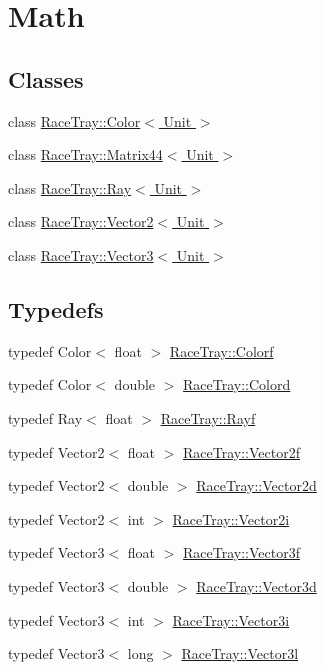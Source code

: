 \hypertarget{group___math}{\section{Math}
\label{group___math}
}
\subsection*{Classes}
\begin{DoxyCompactItemize}
\item 
class \hyperlink{class_race_tray_1_1_color}{Race\-Tray\-::\-Color$<$ Unit $>$}
\item 
class \hyperlink{class_race_tray_1_1_matrix44}{Race\-Tray\-::\-Matrix44$<$ Unit $>$}
\item 
class \hyperlink{class_race_tray_1_1_ray}{Race\-Tray\-::\-Ray$<$ Unit $>$}
\item 
class \hyperlink{class_race_tray_1_1_vector2}{Race\-Tray\-::\-Vector2$<$ Unit $>$}
\item 
class \hyperlink{class_race_tray_1_1_vector3}{Race\-Tray\-::\-Vector3$<$ Unit $>$}
\end{DoxyCompactItemize}
\subsection*{Typedefs}
\begin{DoxyCompactItemize}
\item 
typedef Color$<$ float $>$ \hyperlink{group___math_gaceb269408b1acca232f701aa53d02857}{Race\-Tray\-::\-Colorf}
\item 
typedef Color$<$ double $>$ \hyperlink{group___math_gaf823d8c8bfe82b4114d3d71143b95d63}{Race\-Tray\-::\-Colord}
\item 
typedef Ray$<$ float $>$ \hyperlink{group___math_ga5fdea6c2a8db84c0cc5b7aaeeb48b17a}{Race\-Tray\-::\-Rayf}
\item 
typedef Vector2$<$ float $>$ \hyperlink{group___math_gabf7d0f12bb01ae49c6f6beac2beead58}{Race\-Tray\-::\-Vector2f}
\item 
typedef Vector2$<$ double $>$ \hyperlink{group___math_ga5373c51213c640389207bc20d53938d2}{Race\-Tray\-::\-Vector2d}
\item 
typedef Vector2$<$ int $>$ \hyperlink{group___math_gad3de4c43503d95985d8e4fcbf1a8bc16}{Race\-Tray\-::\-Vector2i}
\item 
typedef Vector3$<$ float $>$ \hyperlink{group___math_gadb6fa781064c3c3c9b13eb984adae162}{Race\-Tray\-::\-Vector3f}
\item 
typedef Vector3$<$ double $>$ \hyperlink{group___math_ga3cf322716609965f0debf240c4eb8ab6}{Race\-Tray\-::\-Vector3d}
\item 
typedef Vector3$<$ int $>$ \hyperlink{group___math_ga732981bed6c760c8857decb1e04b2118}{Race\-Tray\-::\-Vector3i}
\item 
typedef Vector3$<$ long $>$ \hyperlink{group___math_ga7d214bec28c2592b61b69cbf169d45cf}{Race\-Tray\-::\-Vector3l}
\end{DoxyCompactItemize}
